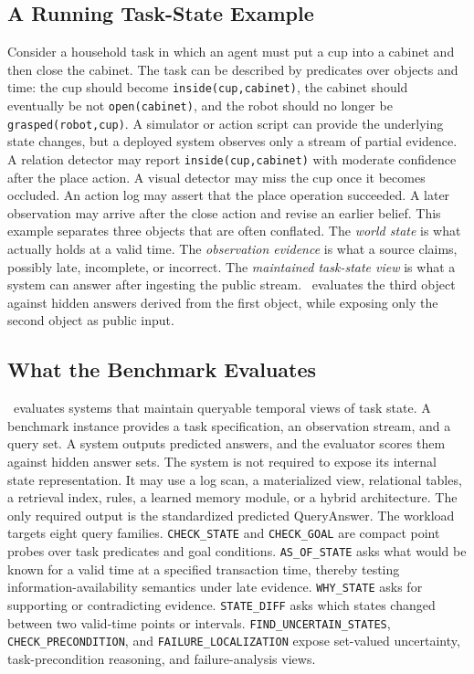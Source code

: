 \subsection{A Running Task-State Example}

Consider a household task in which an agent must put a cup into a cabinet and then close the cabinet. The task can be described by predicates over objects and time: the cup should become \texttt{inside(cup,cabinet)}, the cabinet should eventually be not \texttt{open(cabinet)}, and the robot should no longer be \texttt{grasped(robot,cup)}. A simulator or action script can provide the underlying state changes, but a deployed system observes only a stream of partial evidence. A relation detector may report \texttt{inside(cup,cabinet)} with moderate confidence after the place action. A visual detector may miss the cup once it becomes occluded. An action log may assert that the place operation succeeded. A later observation may arrive after the close action and revise an earlier belief.
This example separates three objects that are often conflated. The \emph{world state} is what actually holds at a valid time. The \emph{observation evidence} is what a source claims, possibly late, incomplete, or incorrect. The \emph{maintained task-state view} is what a system can answer after ingesting the public stream. \bench\ evaluates the third object against hidden answers derived from the first object, while exposing only the second object as public input.

\subsection{What the Benchmark Evaluates}

\bench\ evaluates systems that maintain queryable temporal views of task state. A benchmark instance provides a task specification, an observation stream, and a query set. A system outputs predicted answers, and the evaluator scores them against hidden answer sets. The system is not required to expose its internal state representation. It may use a log scan, a materialized view, relational tables, a retrieval index, rules, a learned memory module, or a hybrid architecture. The only required output is the standardized predicted QueryAnswer.
The workload targets eight query families. \texttt{CHECK\_STATE} and \texttt{CHECK\_GOAL} are compact point probes over task predicates and goal conditions. \texttt{AS\_OF\_STATE} asks what would be known for a valid time at a specified transaction time, thereby testing information-availability semantics under late evidence. \texttt{WHY\_STATE} asks for supporting or contradicting evidence. \texttt{STATE\_DIFF} asks which states changed between two valid-time points or intervals. \texttt{FIND\_UNCERTAIN\_STATES}, \texttt{CHECK\_PRECONDITION}, and \texttt{FAILURE\_LOCALIZATION} expose set-valued uncertainty, task-precondition reasoning, and failure-analysis views.


